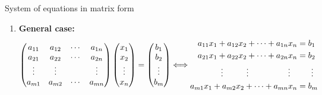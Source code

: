 \documentclass[9pt]{beamer}
\begin{document}
\begin{frame}{System of equations in matrix form}
\begin{enumerate}[leftmargin = 0.6cm, label = $\bullet$, rightmargin = 0.4cm]
        \item \textbf{General case:}
        $$
        \begin{pmatrix}
        a_{11} & a_{12} & \cdots & a_{1n}  \\
        a_{21} & a_{22} & \cdots & a_{2n}  \\
        \vdots & \vdots &        & \vdots  \\
        a_{m1} & a_{m2} & \cdots & a_{mn}  
        \end{pmatrix}
        \begin{pmatrix}
        x_1 \\
        x_2 \\
        \vdots \\
        x_n
        \end{pmatrix}
        =
        \begin{pmatrix}
        b_1 \\
        b_2 \\
        \vdots \\
        b_m
        \end{pmatrix}
        \Longleftrightarrow
        \begin{aligned}
            a_{11}x_1 + a_{12}x_2 + \cdots + a_{1n}x_n  &= b_1 \\
            a_{21}x_1 + a_{22}x_2 + \cdots + a_{2n}x_n  &= b_2 \\
            \vdots \hspace{1cm} \vdots \hspace{1.7cm} \vdots \hspace{0.3cm} & \hspace{0.6cm} \vdots \\
            a_{m1}x_1 + a_{m2}x_2 + \cdots + a_{mn}x_n  &= b_m
        \end{aligned}
        $$
        
    \end{enumerate}

\end{frame}
\end{document}
